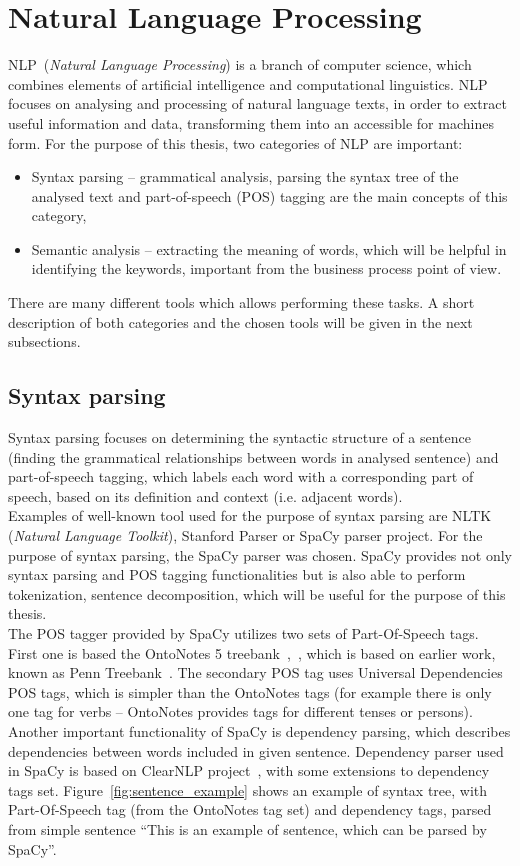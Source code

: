 \section{Natural Language Processing}
\label{sec:nlp}
NLP~(\emph{Natural Language Processing}) is a branch of computer science, which combines elements of artificial intelligence and computational linguistics. NLP focuses on analysing and processing of natural language texts, in order to extract useful information and data, transforming them into an accessible for machines form. For the purpose of this thesis, two categories of NLP are important:
\begin{itemize}
	\item Syntax parsing -- grammatical analysis, parsing the syntax tree of the analysed text and part-of-speech (POS) tagging are the main concepts of this category,
	\item Semantic analysis -- extracting the meaning of words, which will be helpful in identifying the keywords, important from the business process point of view. 
\end{itemize}
There are many different tools which allows performing these tasks. A short description of both categories and the chosen tools will be given in the next subsections.

\subsection{Syntax parsing}
\label{subsec:syntax-parsing}
Syntax parsing focuses on determining the syntactic structure of a sentence (finding the grammatical relationships between words in analysed sentence) and part-of-speech tagging, which labels each word with a corresponding part of speech, based on its definition and context (i.e. adjacent words).\\
Examples of well-known tool used for the purpose of syntax parsing are NLTK (\emph{Natural Language Toolkit}), Stanford Parser or SpaCy parser project. For the purpose of syntax parsing, the SpaCy parser was chosen. SpaCy provides not only syntax parsing and POS tagging functionalities but is also able to perform tokenization, sentence decomposition, which will be useful for the purpose of this thesis.\\
The POS tagger provided by SpaCy utilizes two sets of Part-Of-Speech tags.  First one is based the OntoNotes 5 treebank~\cite{OntoNotes5},~\cite{ontnotes-2006}, which is based on earlier work, known as Penn Treebank~\cite{penntreebank-1993}. The secondary POS tag uses Universal Dependencies POS tags, which is simpler than the OntoNotes tags (for example there is only one tag for verbs -- OntoNotes provides tags for different tenses or persons).  Another important functionality of SpaCy is dependency parsing, which describes dependencies between words included in given sentence. Dependency parser used in SpaCy is based on ClearNLP project~\cite{ClearNLP}, with some extensions to dependency tags set. Figure~\ref{fig:sentence_example} shows an example of syntax tree, with Part-Of-Speech tag (from the OntoNotes tag set) and dependency tags, parsed from simple sentence ``This is an example of sentence, which can be parsed by SpaCy''.

